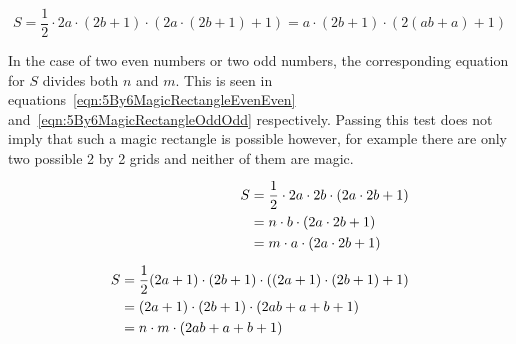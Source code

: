 \begin{equation}
	S = \frac{1}{2} \cdot 2a \cdot (2b + 1) \cdot (2a \cdot (2b + 1) + 1) = a \cdot (2b + 1) \cdot (2(ab + a) + 1)
	\label{eqn:5By6MagicRectangleEvenOdd}
\end{equation}

In the case of two even numbers or two odd numbers, the corresponding equation for $S$ divides both $n$ and $m$. This is seen in equations~\eqref{eqn:5By6MagicRectangleEvenEven} and~\eqref{eqn:5By6MagicRectangleOddOdd} respectively. Passing this test does not imply that such a magic rectangle is possible however, for example there are only two possible 2 by 2 grids and neither of them are magic.

\begin{subequations}
	\begin{align}
		\notag\\[-6mm]
		\begin{split}
			S &= \frac{1}{2} \cdot 2a \cdot 2b \cdot (2a \cdot 2b + 1)  \\
			&= n \cdot b \cdot (2a \cdot 2b + 1)  \\
			&= m \cdot a \cdot (2a \cdot 2b + 1)
			\label{eqn:5By6MagicRectangleEvenEven}
		\end{split}\\[2mm]		
		\begin{split}
			S &= \frac{1}{2} (2a + 1) \cdot (2b + 1) \cdot ((2a + 1) \cdot (2b + 1) + 1)  \\
			&= (2a + 1) \cdot (2b + 1) \cdot (2ab + a + b + 1)  \\
			&= n \cdot m \cdot (2ab + a + b + 1)
			\label{eqn:5By6MagicRectangleOddOdd}
		\end{split}\\[-6mm]\notag
	\end{align}
\end{subequations}










